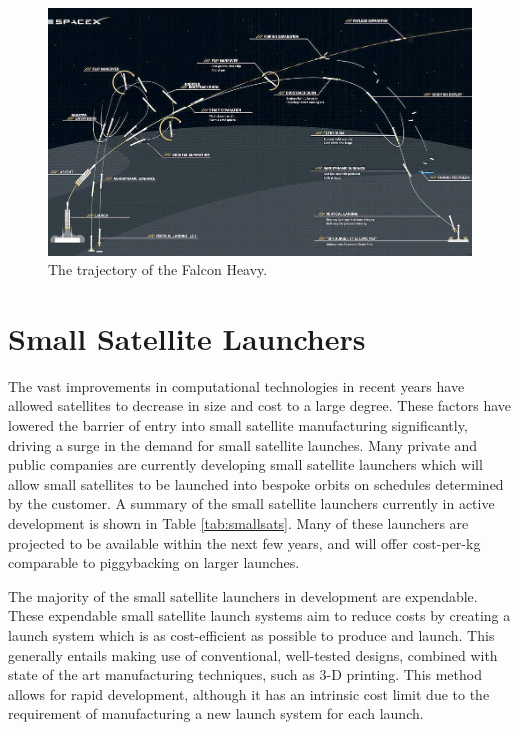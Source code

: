   \begin{figure}
\centering
\includegraphics[width=1\linewidth]{"figures/2_literature-review/FalconTrajectory"}
\caption{The trajectory of the Falcon Heavy\cite{FalconHeavy}.}
\label{fig:FalconTrajectory}
\end{figure}

  
 
  
  \section{Small Satellite Launchers}\label{subsec:smallsats}
 
  The vast improvements in computational technologies in recent years have allowed satellites to decrease in size and cost to a large degree. These factors have lowered the barrier of entry into small satellite manufacturing significantly, driving a surge in the demand for small satellite launches. Many private and public companies are currently developing small satellite launchers which will allow small satellites to be launched into bespoke orbits on schedules determined by the customer. A summary of the small satellite launchers currently in active development is shown in Table \ref{tab:smallsats}. Many of these launchers are projected to be available within the next few years, and will offer cost-per-kg comparable to piggybacking on larger launches. 
  
  
  
  The majority of the small satellite launchers in development are expendable\cite{Niederstrasser2015}. These expendable small satellite launch systems aim to reduce costs by creating a launch system which is as cost-efficient as possible to produce and launch\cite{Niederstrasser2015}. This generally entails making use of conventional, well-tested designs, combined with state of the art manufacturing techniques, such as 3-D printing\cite{Niederstrasser2015,Gilmour}. This method allows for rapid development, although it has an intrinsic cost limit due to the requirement of manufacturing a new launch system for each launch.  
  
